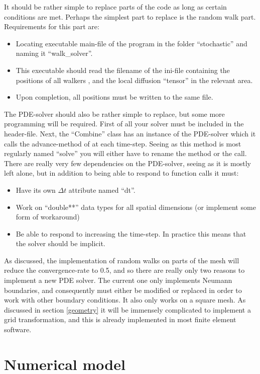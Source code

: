 It should be rather simple to replace parts of the code as long as certain conditions are met. Perhaps the simplest part to replace is the random walk part. 
Requirements for this part are:
\begin{itemize}
 \item Locating executable main-file of the program in the folder ``stochastic'' and naming it ``walk\_solver''. 
 \item This executable should read the filename of the ini-file containing the positions of all walkers , and the local diffusion ``tensor'' in the relevant area.
 \item Upon completion, all positions must be written to the same file.
\end{itemize}
The PDE-solver should also be rather simple to replace, but some more programming will be required. First of all your solver must be included in the header-file. 
Next, the ``Combine'' class has an instance of the PDE-solver which it calls the advance-method of at each time-step. Seeing as this method is most regularly named ``solve'' you will either have to rename the method or the call. 
There are really very few dependencies on the PDE-solver, seeing as it is mostly left alone, but in addition to being able to respond to function calls it must:
\begin{itemize}
 \item Have its own $\Delta t$ attribute named ``dt''.
 \item Work on ``double**'' data types for all spatial dimensions (or implement some form of workaround)
 \item Be able to respond to increasing the time-step. In practice this means that the solver should be implicit.
\end{itemize}
As discussed, the implementation of random walks on parts of the mesh will reduce the convergence-rate to 0.5, and so there are really only two reasons to implement a new PDE solver. 
The current one only implements Neumann boundaries, and consequently must either be modified or replaced in order to work with other boundary conditions.
It also only works on a square mesh. As discussed in section \ref{geometry} it will be immensely complicated to implement a grid transformation, and this is already implemented in most finite element software.

\section{Numerical model}

